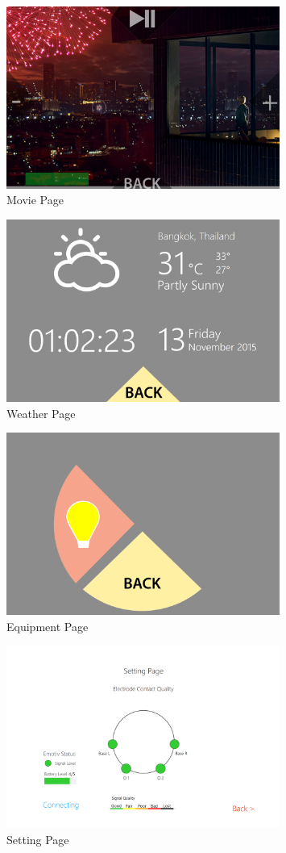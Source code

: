 \begin{figure}[ht]
	\centering
	\includegraphics[width=0.8\textwidth]{chapter6/pagemovie.png}
	\caption{Movie Page}
\end{figure}
\begin{figure}[ht]
	\centering
	\includegraphics[width=0.8\textwidth]{chapter6/pageweather.png}
	\caption{Weather Page}
\end{figure}
\begin{figure}[ht]
	\centering
	\includegraphics[width=0.8\textwidth]{chapter6/pageeqip.png}
	\caption{Equipment Page}
\end{figure}
\begin{figure}[ht]
	\centering
	\includegraphics[width=0.8\textwidth]{chapter6/pagesetting.png}
	\caption{Setting Page}
\end{figure}